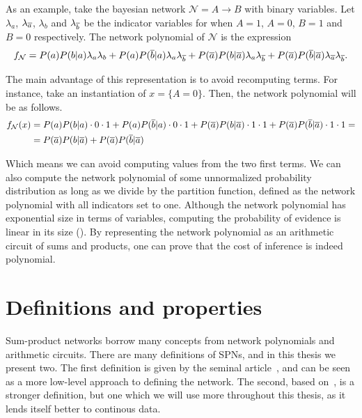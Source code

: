 As an example, take the bayesian network $\mathcal{N}=A\to B$ with binary variables. Let
$\lambda_a$, $\lambda_{\overline{a}}$, $\lambda_b$ and $\lambda_{\overline{b}}$ be the indicator variables for
when $A=1$, $A=0$, $B=1$ and $B=0$ respectively. The network polynomial of $\mathcal{N}$ is the
expression
\begin{equation*}
  f_{\mathcal{N}}=P(a)P(b|a)\lambda_a\lambda_b+P(a)P(\overline{b}|a)\lambda_a\lambda_{\overline{b}}+
  P(\overline{a})P(b|\overline{a})\lambda_a\lambda_{\overline{b}}+P(\overline{a})P(\overline{b}|\overline{a})\lambda_{\overline{a}}
  \lambda_{\overline{b}}.
\end{equation*}

The main advantage of this representation is to avoid recomputing terms. For instance, take an
instantiation of $x=\{A=0\}$. Then, the network polynomial will be as follows.
\begin{align*}
  f_{\mathcal{N}}(x)&=P(a)P(b|a)\cdot 0\cdot 1+P(a)P(\overline{b}|a)\cdot 0\cdot
  1+P(\overline{a})P(b|\overline{a})\cdot 1\cdot 1+P(\overline{a})P(\overline{b}|\overline{a})\cdot 1\cdot 1=\\
  &=P(\overline{a})P(b|\overline{a})+P(\overline{a})P(\overline{b}|\overline{a})
\end{align*}

Which means we can avoid computing values from the two first terms. We can also compute the network
polynomial of some unnormalized probability distribution as long as we divide by the partition
function, defined as the network polynomial with all indicators set to one. Although the network
polynomial has exponential size in terms of variables, computing the probability of evidence is
linear in its size (\cite{diff-approach-darwiche}). By representing the network polynomial as an
arithmetic circuit of sums and products, one can prove that the cost of inference is indeed
polynomial.

\section{Definitions and properties}

Sum-product networks borrow many concepts from network polynomials and arithmetic circuits. There
are many definitions of SPNs, and in this thesis we present two. The first definition is given by
the seminal article~\cite{poon-domingos}, and can be seen as a more low-level approach to defining
the network\@. The second, based on~\cite{gens-domingos}, is a stronger definition, but one which
we will use more throughout this thesis, as it lends itself better to continous data.

